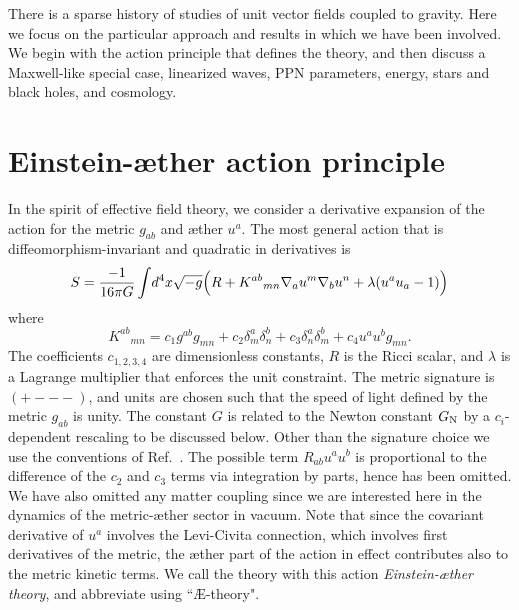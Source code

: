 \documentclass[aps]{ws-procs9x6}
\begin{document}
There is a sparse history of studies of unit vector fields
coupled to
gravity.\cite{Gasperini,KosSam,Clayton,Barbero,Bekenstein,CLim,Lim}
Here we focus on the particular approach and results in which we
have been
involved.\cite{JM,MJindy,JMmatter,ElingJ1,JMwaves,ElingJ2} We
begin with the action principle that defines the theory, and then
discuss a Maxwell-like special case, linearized waves, PPN
parameters, energy, stars and black holes, and cosmology.

\section{Einstein-{\ae}ther action principle}
In the spirit of effective field theory, we consider a derivative
expansion of the action for the metric $g_{ab}$ and {\ae}ther
$u^a$.  The most general action that is diffeomorphism-invariant
and quadratic in derivatives is
%
\begin{equation} \label{eq:action}
S=\frac{-1}{16\pi G }
\int \!d^4x \sqrt{-g} \Bigl(R+K^{ab}{}{}_{mn} \nabla_a u^m \nabla_b
u^n +\lambda (u^a u_a -1)\Bigr)
\end{equation}
%
where
%
\begin{equation}
    K^{ab}{}{}_{mn}=c_1 g^{ab} g_{mn} + c_2 \delta^a_m \delta^b_n
    + c_3 \delta^a_n \delta^b_m + c_4 u^a u^b g_{mn}.
    \label{K}
\end{equation}
%
The coefficients $c_{1,2,3,4}$ are dimensionless constants, $R$
is the Ricci scalar, and $\lambda$ is a Lagrange multiplier that
enforces the unit constraint. The metric signature is
$({+}{-}{-}{-})$, and units are chosen such that the speed of
light defined by the metric $g_{ab}$ is unity. The constant $G$
is related to the Newton constant $G_{\rm N}$ by a
$c_i$-dependent rescaling to be discussed below. Other than the
signature choice we use the conventions of Ref.~.
The possible term $R_{ab} u^a u^b$ is proportional to the
difference of the $c_2$ and $c_3$ terms via integration by parts,
hence has been omitted. We have also omitted any matter coupling
since we are interested here in the dynamics of the
metric-{\ae}ther sector in vacuum. Note that since the covariant
derivative of $u^a$ involves the Levi-Civita connection, which
involves first derivatives of the metric, the {\ae}ther part of
the action in effect contributes also to the metric kinetic
terms. We call the theory with this action {\it Einstein-{\ae}ther
theory}, and abbreviate using ``\AE-theory".
\end{document}
